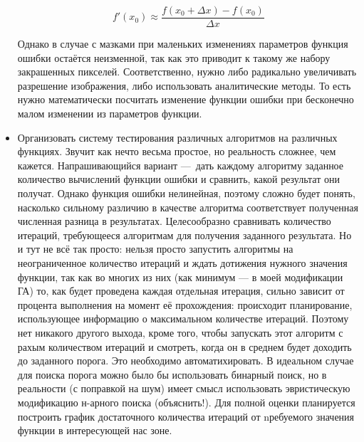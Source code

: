 \documentclass[11pt]{article}
\begin{document}
\begin{itemize}
                \begin{equation}
                    f'(x_0) \approx \frac{f(x_0 + \Delta x) - f(x_0)}{\Delta x}
                \end{equation}

                Однако в случае с мазками при маленьких изменениях параметров функция ошибки остаётся неизменной, так как это приводит к такому же набору закрашенных пикселей.
                Соответственно, нужно либо радикально увеличивать разрешение изображения, либо использовать аналитические методы.
                То есть нужно математически посчитать изменение функции ошибки при бесконечно малом изменении из параметров функции.

        \item Организовать систему тестирования различных алгоритмов на различных функциях. Звучит как нечто весьма простое, но реальность сложнее, чем кажется.
        Напрашивающийся вариант — дать каждому алгоритму заданное количество вычислений функции ошибки и сравнить, какой результат они получат.
        Однако функция ошибки нелинейная, поэтому сложно будет понять, насколько сильному различию в качестве алгоритма соответствует полученная численная разница в результатах.
        Целесообразно сравнивать количество итераций, требующееся алгоритмам для получения заданного результата.
        Но и тут не всё так просто: нельзя просто запустить алгоритмы на неограниченное количество итераций и ждать дотижения нужного значения функции,
        так как во многих из них (как минимум — в моей модификации ГА) то, как будет проведена каждая отдельная итерация, сильно зависит от процента выполнения на момент её прохождения: происходит планирование,
        использующее информацию о максимальном количестве итераций.
        Поэтому нет никакого другого выхода, кроме того, чтобы запускать этот алгоритм с рахым количеством итераций и смотреть, когда он в среднем будет доходить до заданного порога.
        Это необходимо автоматихировать.
        В идеальном случае для поиска порога можно было бы использовать бинарный поиск, но в реальности (с поправкой на шум) имеет смысл использовать эвристическую модификацию н-арного поиска (объяснить!).
        Для полной оценки планируется построить график достаточного количества итераций от nребуемого значения функции в интересующей нас зоне.

    \end{itemize}
\end{document}
